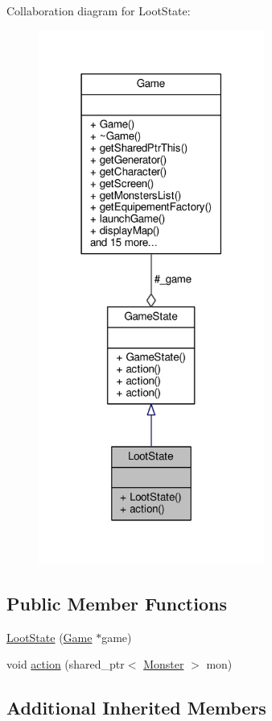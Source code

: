Collaboration diagram for Loot\-State\-:
\nopagebreak
\begin{figure}[H]
\begin{center}
\leavevmode
\includegraphics[width=210pt]{class_loot_state__coll__graph}
\end{center}
\end{figure}
\subsection*{Public Member Functions}
\begin{DoxyCompactItemize}
\item 
\hyperlink{class_loot_state_a392fbfed92f45bd14de31f8de8f7a55d}{Loot\-State} (\hyperlink{class_game}{Game} $\ast$game)
\item 
void \hyperlink{class_loot_state_a35ac3a3825b8da2572f72c25e714cf44}{action} (shared\-\_\-ptr$<$ \hyperlink{class_monster}{Monster} $>$ mon)
\end{DoxyCompactItemize}
\subsection*{Additional Inherited Members}


